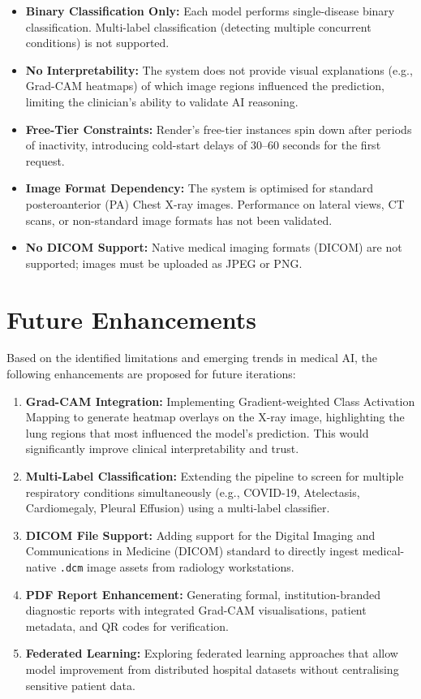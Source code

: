 \documentclass[12pt, a4paper, oneside]{report}
\begin{document}
\begin{itemize}
    \item \textbf{Binary Classification Only:} Each model performs single-disease binary classification. Multi-label classification (detecting multiple concurrent conditions) is not supported.
    \item \textbf{No Interpretability:} The system does not provide visual explanations (e.g., Grad-CAM heatmaps) of which image regions influenced the prediction, limiting the clinician's ability to validate AI reasoning.
    \item \textbf{Free-Tier Constraints:} Render's free-tier instances spin down after periods of inactivity, introducing cold-start delays of 30--60 seconds for the first request.
    \item \textbf{Image Format Dependency:} The system is optimised for standard posteroanterior (PA) Chest X-ray images. Performance on lateral views, CT scans, or non-standard image formats has not been validated.
    \item \textbf{No DICOM Support:} Native medical imaging formats (DICOM) are not supported; images must be uploaded as JPEG or PNG.
\end{itemize}

\section{Future Enhancements}
\label{sec:future_work}

Based on the identified limitations and emerging trends in medical AI, the following enhancements are proposed for future iterations:

\begin{enumerate}[label=\arabic*.]
    \item \textbf{Grad-CAM Integration:} Implementing Gradient-weighted Class Activation Mapping to generate heatmap overlays on the X-ray image, highlighting the lung regions that most influenced the model's prediction. This would significantly improve clinical interpretability and trust.

    \item \textbf{Multi-Label Classification:} Extending the pipeline to screen for multiple respiratory conditions simultaneously (e.g., COVID-19, Atelectasis, Cardiomegaly, Pleural Effusion) using a multi-label classifier.

    \item \textbf{DICOM File Support:} Adding support for the Digital Imaging and Communications in Medicine (DICOM) standard to directly ingest medical-native \texttt{.dcm} image assets from radiology workstations.

    \item \textbf{PDF Report Enhancement:} Generating formal, institution-branded diagnostic reports with integrated Grad-CAM visualisations, patient metadata, and QR codes for verification.

    \item \textbf{Federated Learning:} Exploring federated learning approaches that allow model improvement from distributed hospital datasets without centralising sensitive patient data.
\end{enumerate}
\end{document}
